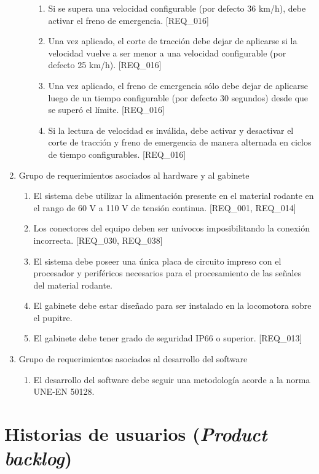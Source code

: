 \documentclass[11pt]{charter}
\begin{document}
\begin{enumerate}
\begin{enumerate}
\begin{enumerate}
    \item Si se supera una velocidad configurable (por defecto 36 km/h), debe activar el freno de emergencia. [REQ\_016]
    \item Una vez aplicado, el corte de tracción debe dejar de aplicarse si la velocidad vuelve a ser menor a una velocidad configurable (por defecto 25 km/h). [REQ\_016]
    \item Una vez aplicado, el freno de emergencia sólo debe dejar de aplicarse luego de un tiempo configurable (por defecto 30 segundos) desde que se superó el límite. [REQ\_016]
    \item Si la lectura de velocidad es inválida, debe activar y desactivar el corte de tracción y freno de emergencia de manera alternada en ciclos de tiempo configurables. [REQ\_016]
    \end{enumerate}
  \end{enumerate}
\item Grupo de requerimientos asociados al hardware y al gabinete
  \begin{enumerate}
    \item El sistema debe utilizar la alimentación presente en el material rodante en el rango de 60 V a 110 V de tensión continua. [REQ\_001, REQ\_014]
    \item Los conectores del equipo deben ser unívocos imposibilitando la conexión incorrecta. [REQ\_030, REQ\_038]
    \item El sistema debe poseer una única placa de circuito impreso con el procesador y periféricos necesarios para el procesamiento de las señales del material rodante.
    \item El gabinete debe estar diseñado para ser instalado en la locomotora sobre el pupitre.
    \item El gabinete debe tener grado de seguridad IP66 o superior. [REQ\_013]
  \end{enumerate}
\item Grupo de requerimientos asociados al desarrollo del software
  \begin{enumerate}
    \item El desarrollo del software debe seguir una metodología acorde a la norma UNE-EN 50128.
  \end{enumerate}
\end{enumerate}

\newpage

\section{Historias de usuarios (\textit{Product backlog})}
\label{sec:backlog}
\end{document}
